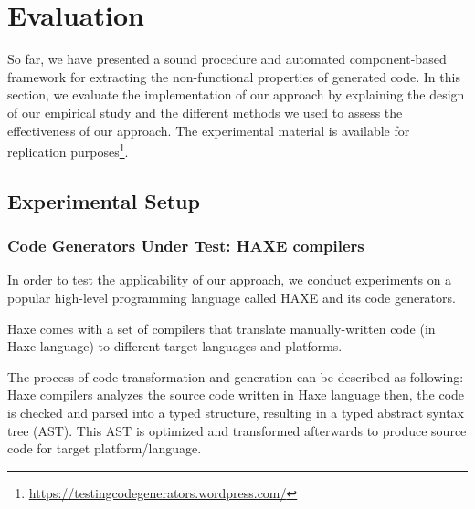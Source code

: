 \section{Evaluation}
So far, we have presented a sound procedure and automated component-based framework for extracting the non-functional properties of generated code. In this section, we evaluate the implementation of our approach by explaining the design of our empirical study and the different methods we used to assess the effectiveness of our approach. 
The experimental material is available for replication purposes\footnote{\url{https://testingcodegenerators.wordpress.com/}}.
\subsection{Experimental Setup}
\subsubsection{Code Generators Under Test: HAXE compilers}
In order to test the applicability of our approach, we conduct experiments on a popular high-level programming language called HAXE and its code generators.

Haxe comes with a set of compilers that translate manually-written code (in Haxe language) to different target languages and platforms. 

The process of code transformation and generation can be described as following: Haxe compilers analyzes the source code written in Haxe language then, the code is checked and parsed into a typed structure, resulting in a typed abstract syntax tree (AST). This AST is optimized and transformed afterwards to produce source code for target platform/language.

